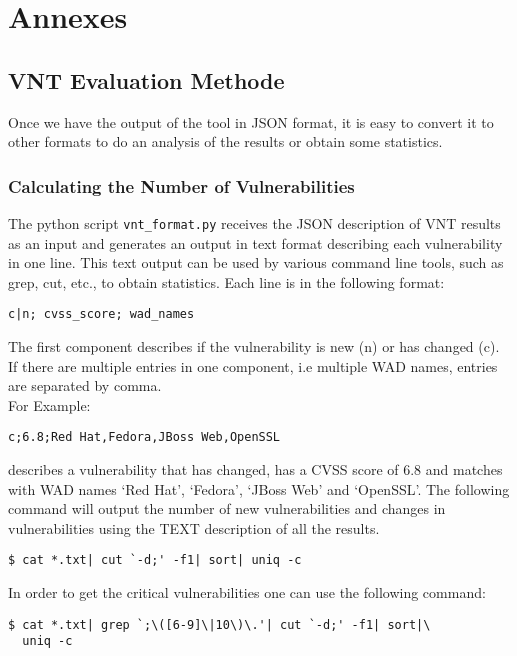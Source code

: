 \chapter{Annexes}
\label{app}


\section{VNT Evaluation Methode}
\label{vnt_evaluation_method}
Once we have the output of the tool in JSON format, it is easy to convert it to other formats to do an analysis of the results or obtain some statistics. 
\subsection{Calculating the Number of Vulnerabilities}
The python script \texttt{vnt\_format.py} receives the JSON description of VNT results as an input and generates an output in text format describing each vulnerability in one line. This text output can be used by various command line tools, such as grep, cut, etc., to obtain statistics. 
Each line is in the following format:
\begin{framed}

\texttt{c|n;%
cvss\_score;%
wad\_names
}

\end{framed}
The first component describes if the vulnerability is new (n) or has changed (c). If there are multiple entries in one component, i.e multiple WAD names, entries are separated by comma.
\\
For Example:
\begin{framed}
\texttt{c;6.8;Red Hat,Fedora,JBoss Web,OpenSSL}
\end{framed}
describes a vulnerability that has changed, has a CVSS score of 6.8 and matches with WAD names `Red Hat', `Fedora', `JBoss Web' and `OpenSSL'.
The following command will output the number of new vulnerabilities and changes in vulnerabilities using the TEXT description of all the results. 
\begin{framed}
\begin{verbatim}
$ cat *.txt| cut `-d;' -f1| sort| uniq -c
\end{verbatim}
\end{framed}
In order to get the critical vulnerabilities one can use the following command:
\begin{framed}
\begin{verbatim}
$ cat *.txt| grep `;\([6-9]\|10\)\.'| cut `-d;' -f1| sort|\
  uniq -c
\end{verbatim}
\end{framed}
